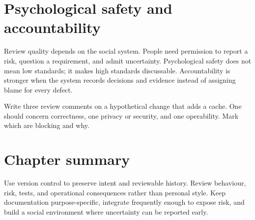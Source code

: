 \section{Psychological safety and accountability}
Review quality depends on the social system. People need permission to report a
risk, question a requirement, and admit uncertainty. Psychological safety does
not mean low standards; it makes high standards discussable. Accountability is
stronger when the system records decisions and evidence instead of assigning
blame for every defect.

\begin{exercise}
Write three review comments on a hypothetical change that adds a cache. One
should concern correctness, one privacy or security, and one operability. Mark
which are blocking and why.
\end{exercise}

\section{Chapter summary}
Use version control to preserve intent and reviewable history. Review behaviour,
risk, tests, and operational consequences rather than personal style. Keep
documentation purpose-specific, integrate frequently enough to expose risk, and
build a social environment where uncertainty can be reported early.
